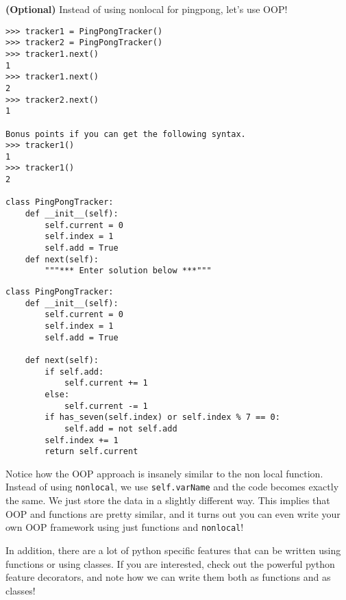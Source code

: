 \begin{blocksection}
\question \textbf{(Optional)} Instead of using nonlocal for pingpong, let's use OOP!

\begin{nonsol}
\begin{lstlisting}
>>> tracker1 = PingPongTracker()
>>> tracker2 = PingPongTracker()
>>> tracker1.next()
1
>>> tracker1.next()
2
>>> tracker2.next()
1

Bonus points if you can get the following syntax.
>>> tracker1()
1
>>> tracker1()
2

class PingPongTracker:
    def __init__(self):
        self.current = 0
        self.index = 1
        self.add = True
    def next(self):
        """*** Enter solution below ***"""
\end{lstlisting}
\end{nonsol}

\begin{solution}[0.3in]
\begin{lstlisting}
class PingPongTracker:
    def __init__(self):
        self.current = 0
        self.index = 1
        self.add = True

    def next(self):
        if self.add:
            self.current += 1
        else:
            self.current -= 1
        if has_seven(self.index) or self.index % 7 == 0:
            self.add = not self.add
        self.index += 1
        return self.current

\end{lstlisting}
Notice how the OOP approach is insanely similar to the non local function.
Instead of using \texttt{nonlocal}, we use \texttt{self.varName} and the code
becomes exactly the same. We just store the data in a slightly different way.
This implies that OOP and functions are pretty similar, and it turns out you can
even write your own OOP framework using just functions and \texttt{nonlocal}!

In addition, there are a lot of python specific features that can be written
using functions or using classes. If you are interested, check out the powerful
python feature decorators, and note how we can write them both as functions and
as classes!
\end{solution}

\end{blocksection}
